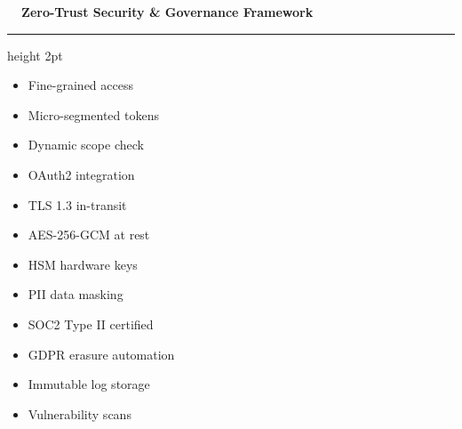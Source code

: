 \documentclass[landscape]{slides}
\newcommand{\slidetitle}[1]{%
  {\Large\bfseries\color{NavyDark} #1}\par\vspace{0.3em}%
  {\color{TealAccent}\hrule height 2pt}\vspace{0.6em}%
}
\begin{document}
\begin{slide}
\slidetitle{\faLock~~Zero-Trust Security \& Governance Framework}

\begin{minipage}[t]{0.31\textwidth}
  \begin{tcolorbox}[colback=CardBg,colframe=NavyDark,title=\textbf{\faKey~~IAM \& ABAC Policy}]
    \small
    \begin{itemize}
      \item Fine-grained access
      \item Micro-segmented tokens
      \item Dynamic scope check
      \item OAuth2 integration
    \end{itemize}
  \end{tcolorbox}
\end{minipage}%
\hfill
\begin{minipage}[t]{0.31\textwidth}
  \begin{tcolorbox}[colback=CardBg,colframe=TealAccent,title=\textbf{\faLock~~End-to-End Encryption}]
    \small
    \begin{itemize}
      \item TLS 1.3 in-transit
      \item AES-256-GCM at rest
      \item HSM hardware keys
      \item PII data masking
    \end{itemize}
  \end{tcolorbox}
\end{minipage}%
\hfill
\begin{minipage}[t]{0.31\textwidth}
  \begin{tcolorbox}[colback=CardBg,colframe=CoralAccent,title=\textbf{\faFile~~Compliance \& Audit}]
    \small
    \begin{itemize}
      \item SOC2 Type II certified
      \item GDPR erasure automation
      \item Immutable log storage
      \item Vulnerability scans
    \end{itemize}
  \end{tcolorbox}
\end{minipage}
\end{slide}
\end{document}
